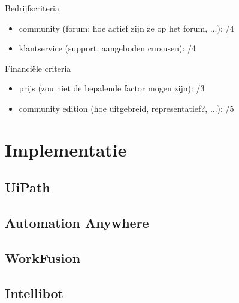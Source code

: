 Bedrijfscriteria
\begin{itemize}
	\item community (forum: hoe actief zijn ze op het forum, ...): /4
	\item klantservice (support, aangeboden cursusen): /4
\end{itemize}

Financiële criteria
\begin{itemize}
	\item prijs (zou niet de bepalende factor mogen zijn): /3
	\item community edition (hoe uitgebreid, representatief?, ...): /5
\end{itemize}


\section{Implementatie}
\subsection{UiPath}



\subsection{Automation Anywhere}

\subsection{WorkFusion}

\subsection{Intellibot}
